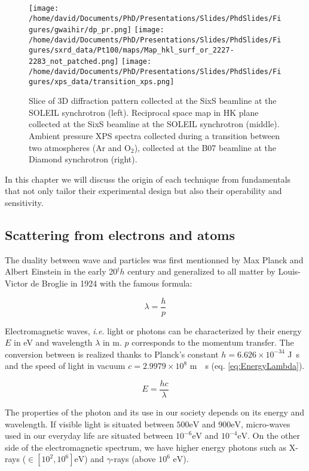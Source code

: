 \begin{figure}[!htb]
    \centering
    \texttt{[image: /home/david/Documents/PhD/Presentations/Slides/PhdSlides/Figures/gwaihir/dp\_pr.png]}
    \texttt{[image: /home/david/Documents/PhD/Presentations/Slides/PhdSlides/Figures/sxrd\_data/Pt100/maps/Map\_hkl\_surf\_or\_2227-2283\_not\_patched.png]}
    \texttt{[image: /home/david/Documents/PhD/Presentations/Slides/PhdSlides/Figures/xps\_data/transition\_xps.png]}
    \caption{Slice of 3D diffraction pattern collected at the SixS beamline at the SOLEIL synchrotron (left). Reciprocal space map in HK plane collected at the SixS beamline at the SOLEIL synchrotron (middle). Ambient pressure XPS spectra collected during a transition between two atmospheres (Ar and O$_2$), collected at the B07 beamline at the Diamond synchrotron (right).}
\end{figure}


In this chapter we will discuss the origin of each technique from fundamentals that not only tailor their experimental design but also their operability and sensitivity.

\subsection{Scattering from electrons and atoms}

The duality between wave and particles was first mentionned by Max Planck and Albert Einstein in the early 20${^th}$ century and generalized to all matter by Louis-Victor de Broglie in 1924 with the famous formula:

\begin{equation}
	\lambda = \frac{h}{p}
\end{equation}

Electromagnetic waves, \textit{i.e.} light or photons can be characterized by their energy $E$ in \si{\electronvolt} and wavelength $\lambda$ in \si{\meter}. $p$ corresponds to the momentum transfer.
The conversion between is realized thanks to Planck's constant $h = 6.626 \times 10^{-34}$ \si{\joule.\second} and the speed of light in vacuum $c = 2.9979 \times 10^{8}$ \si{\meter.\per \second} (eq. \ref{eq:EnergyLambda}).

\begin{equation}
    \label{eq:EnergyLambda}
	E = \frac{hc}{\lambda}
\end{equation}

The properties of the photon and its use in our society depends on its energy and wavelength.
If visible light is situated between $500 \si{\electronvolt}$ and $900 \si{\electronvolt}$, micro-waves used in our everyday life are situated between $10^{-6} \si{\electronvolt}$ and $10^{-4}\si{\electronvolt}$.
On the other side of the electromagnetic spectrum, we have higher energy photons such as X-rays ($\in [10^{2}, 10^{6}] \si{\electronvolt}$) and $\gamma$-rays (above $10^{6}$ $\si{\electronvolt}$).

